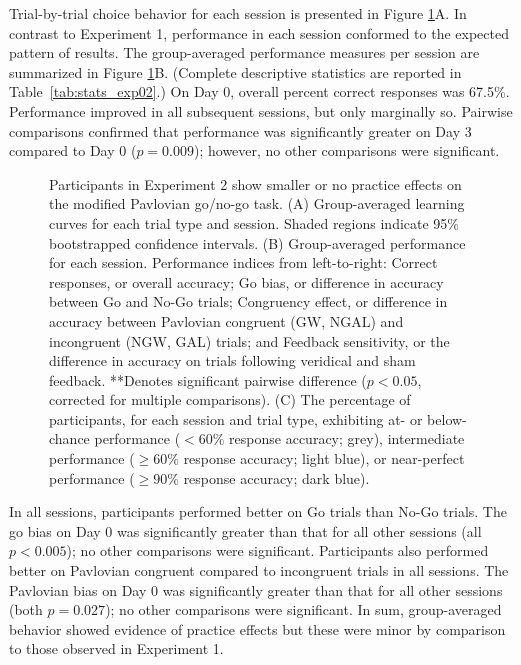 \documentclass[a4paper,12pt]{article}
\begin{document}
\begin{refsection}[main]
Trial-by-trial choice behavior for each session is presented in Figure \ref{fig:exp02_behavior}A. In contrast to Experiment 1, performance in each session conformed to the expected pattern of results. The group-averaged performance measures per session are summarized in Figure \ref{fig:exp02_behavior}B. (Complete descriptive statistics are reported in Table~\ref{tab:stats_exp02}.) On Day 0, overall percent correct responses was 67.5\%. Performance improved in all subsequent sessions, but only marginally so. Pairwise comparisons confirmed that performance was significantly greater on Day 3 compared to Day 0 ($p = 0.009$); however, no other comparisons were significant.

\begin{figure}[hpt]
    \centerline{}
    \caption{Participants in Experiment 2 show smaller or no practice effects on the modified Pavlovian go/no-go task. (A) Group-averaged learning curves for each trial type and session. Shaded regions indicate 95\% bootstrapped confidence intervals. (B) Group-averaged performance for each session. Performance indices from left-to-right: Correct responses, or overall accuracy; Go bias, or difference in accuracy between Go and No-Go trials; Congruency effect, or difference in accuracy between Pavlovian congruent (GW, NGAL) and incongruent (NGW, GAL) trials; and Feedback sensitivity, or the difference in accuracy on trials following veridical and sham feedback. **Denotes significant pairwise difference ($p < 0.05$, corrected for multiple comparisons). (C) The percentage of participants, for each session and trial type, exhibiting at- or below-chance performance ($< 60\%$ response accuracy; grey), intermediate performance ($\geq 60\%$ response accuracy; light blue), or near-perfect performance ($\geq 90\%$ response accuracy; dark blue).}
    \label{fig:exp02_behavior}
\end{figure}

In all sessions, participants performed better on Go trials than No-Go trials. The go bias on Day 0 was significantly greater than that for all other sessions (all $p < 0.005$); no other comparisons were significant. Participants also performed better on Pavlovian congruent compared to incongruent trials in all sessions. The Pavlovian bias on Day 0 was significantly greater than that for all other sessions (both $p = 0.027$); no other comparisons were significant. In sum, group-averaged behavior showed evidence of practice effects but these were minor by comparison to those observed in Experiment 1. 


\end{refsection}
\end{document}
